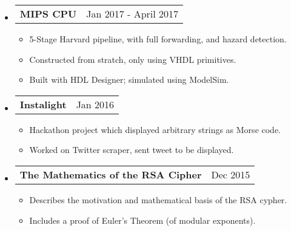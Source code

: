 \documentclass[18pt]{article}
\makeatletter
\providecommand{\tightlist}{
    \setlength{\itemsep}{0pt}\setlength{\parskip}{0pt}
}
\providecommand{\datetable}[2]{
    \begin{tabular*}{\textwidth}{@{}r @{\extracolsep{\fill}} l}
        #1 & #2
    \end{tabular*}
}
\makeatother
\begin{document}
\begin{itemize}[label={}]
        \item \datetable{\textbf{MIPS CPU}}{Jan 2017 - April 2017}
        \begin{itemize}\tightlist
            \item 5-Stage Harvard pipeline, with full forwarding, and hazard detection.
            \item Constructed from stratch, only using VHDL primitives.
            \item Built with HDL Designer; simulated using ModelSim.
        \end{itemize}
      
      
            
        \item \datetable{\textbf{Instalight}}{Jan 2016}
        \begin{itemize}\tightlist
            \item Hackathon project which displayed arbitrary strings as Morse code.
            \item Worked on Twitter scraper, sent tweet to be displayed.
        \end{itemize}
        
        \item \datetable{\textbf{The Mathematics of the RSA Cipher}}{Dec 2015}
        \begin{itemize}\tightlist
            \item Describes the motivation and mathematical basis of the RSA cypher.
            \item Includes a proof of Euler's Theorem (of modular exponents).
        \end{itemize}
  \end{itemize}
    
\end{document}
